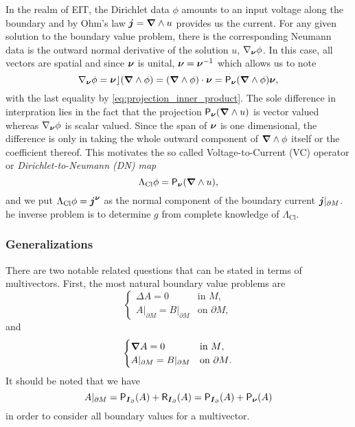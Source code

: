In the realm of EIT, the Dirichlet data $\phi$ amounts to an input voltage along the boundary and by Ohm's law $\boldsymbol{j}=\boldsymbol{\nabla} \wedge u$ provides us the current. For any given solution to the boundary value problem, there is the corresponding Neumann data is the outward normal derivative of the solution $u$, $\nabla_{\boldsymbol{\nu}} \phi$. In this case, all vectors are spatial and since $\boldsymbol{\nu}$ is unital, $\boldsymbol{\nu}=\boldsymbol{\nu}^{-1}$ which allows us to note
\begin{equation}
\nabla_{\boldsymbol{\nu}} \phi = \boldsymbol{\nu}\rfloor (\boldsymbol{\nabla} \wedge \phi) = (\boldsymbol{\nabla} \wedge \phi) \cdot \boldsymbol{\nu} = \mathsf{P}_{\boldsymbol{\nu}} (\boldsymbol{\nabla} \wedge \phi) \boldsymbol{\nu},
\end{equation}
with the last equality by \cref{eq:projection_inner_product}. The sole difference in interpration lies in the fact that the projection $\mathsf{P}_{\boldsymbol{\nu}}(\boldsymbol{\nabla} \wedge u)$ is vector valued whereas $\nabla_{\boldsymbol{\nu}}\phi$ is scalar valued. Since the span of $\boldsymbol{\nu}$ is one dimensional, the difference is only in taking the whole outward component of $\boldsymbol{\nabla} \wedge \phi$ itself or the coefficient thereof. This motivates the so called Voltage-to-Current (VC) operator or  \emph{Dirichlet-to-Neumann (DN) map}
\begin{equation}
\label{eq:classical_dn_map}
\Lambda_\textrm{Cl} \phi = \mathsf{P}_{\boldsymbol{\nu}}(\boldsymbol{\nabla} \wedge u),
\end{equation}
and we put $\Lambda_{\textrm{Cl}} \phi = \boldsymbol{j}^{\boldsymbol{\nu}}$ as the normal component of the boundary current $\boldsymbol{j}\vert_{{\partial M}}$. he inverse problem is to determine $g$ from complete knowledge of $\Lambda_{\textrm{Cl}}$.

\subsubsection{Generalizations}

There are two notable related questions that can be stated in terms of multivectors. First, the most natural boundary value problems are 
\begin{equation}
\label{eq:multivector_harmonic_bvp}
\begin{cases}
\Delta A = 0 & \textrm{in $M$},\\
A\vert_{\partial M} = B\vert_{\partial M} & \textrm{on $\partial M$},
\end{cases}
\end{equation}
and
\begin{equation}
\label{eq:multivector_monogenic_bvp}
\begin{cases}
\boldsymbol{\nabla} A = 0 & \textrm{in $M$},\\
A\vert_{\partial M} = B\vert_{\partial M} & \textrm{on $\partial M$}.
\end{cases}
\end{equation}
It should be noted that we have
\begin{equation}
A\vert_{\partial M} = \mathsf{P}_{\boldsymbol{I}_\partial}(A) + \mathsf{R}_{\boldsymbol{I}_\partial}(A) = \mathsf{P}_{\boldsymbol{I}_\partial}(A) + \mathsf{P}_{\boldsymbol{\nu}}(A)
\end{equation}
in order to consider all boundary values for a multivector. 

